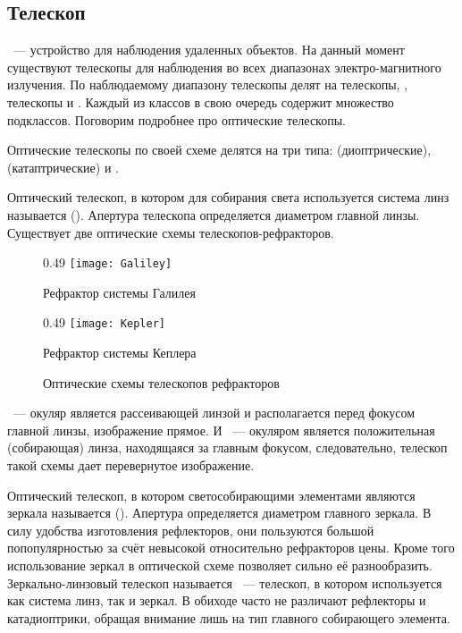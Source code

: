 \subsection{Телескоп}
~--- устройство для наблюдения удаленных объектов. На данный момент существуют телескопы  для наблюдения во всех  диапазонах электро-магнитного излучения. По наблюдаемому диапазону телескопы делят на  телескопы, ,  телескопы и . Каждый из классов в свою очередь содержит множество подклассов. Поговорим подробнее про оптические телескопы.

Оптические телескопы по своей схеме делятся на три типа:  (диоптрические),  (катаптрические) и .

Оптический телескоп, в котором для собирания света используется система линз называется  (). Апертура телескопа определяется диаметром главной линзы. Существует две оптические схемы телескопов-рефракторов. 

\vspace{-.3pc}
\begin{figure}[h!]
	\centering
	\begin{subcaptionblock}{0.49\tw}
		\texttt{[image: Galiley]}
		\caption{Рефрактор системы Галилея}
	\end{subcaptionblock}
	\hfill
	\begin{subcaptionblock}{0.49\tw}
		\texttt{[image: Kepler]}
		\caption{Рефрактор системы Кеплера}
		\label{Kepler}
	\end{subcaptionblock}
	\caption{Оптические схемы телескопов рефракторов}
\end{figure}

~--- окуляр является рассеивающей линзой и располагается перед фокусом главной линзы, изображение прямое. И ~--- окуляром является положительная (собирающая) линза, находящаяся за главным фокусом, следовательно, телескоп такой схемы дает перевернутое изображение.

Оптический телескоп,  в котором светособирающими элементами являются зеркала называется  (). Апертура определяется диаметром главного зеркала. В силу удобства изготовления рефлекторов, они пользуются большой попопулярностью за счёт невысокой относительно рефракторов цены. Кроме того использование зеркал в оптической схеме позволяет сильно её разнообразить. Зеркально-линзовый телескоп называется ~--- телескоп, в котором используется как система линз, так и зеркал. В обиходе часто не различают рефлекторы и катадиоптрики, обращая внимание лишь на тип главного собирающего элемента. 

